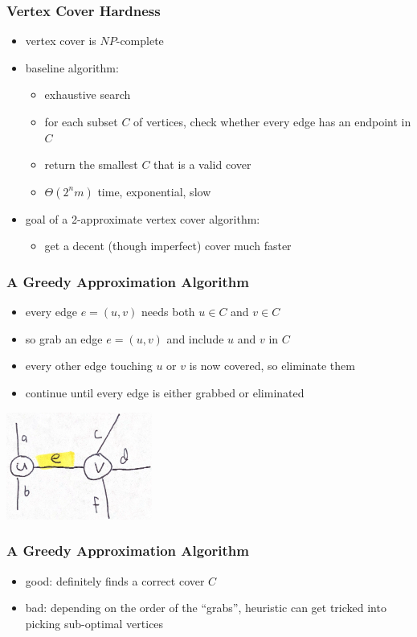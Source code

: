 \documentclass[10pt,aspectratio=169]{beamer}
\begin{document}
\begin{frame} \frametitle{Vertex Cover Hardness}
  \begin{itemize}
    \item vertex cover is $NP$-complete
    \item baseline algorithm:
    \begin{itemize}
      \item exhaustive search
      \item for each subset $C$ of vertices, check whether every edge has an
        endpoint in $C$
      \item return the smallest $C$ that is a valid cover
      \item $\Theta(2^n m)$ time, exponential, slow
    \end{itemize}
    \item goal of a 2-approximate vertex cover algorithm:
    \begin{itemize}
      \item get a decent (though imperfect) cover much faster
    \end{itemize}
  \end{itemize}
\end{frame}

\begin{frame} \frametitle{A Greedy Approximation Algorithm}
\begin{itemize}
  \item every edge $e=(u,v)$ needs both $u \in C$ and $v \in C$
  \item so grab an edge $e=(u,v)$ and include $u$ and $v$ in $C$
  \item every other edge touching $u$ or $v$ is now covered, so eliminate them
  \item continue until every edge is either grabbed or eliminated
\end{itemize}
\begin{center}
  \includegraphics[height=100pt]{vertex-cover-greedy.png}
\end{center}
\end{frame}

\begin{frame} \frametitle{A Greedy Approximation Algorithm}
\begin{itemize}
    \item good: definitely finds a correct cover $C$
    \item bad: depending on the order of the ``grabs'', heuristic can get tricked
    into picking sub-optimal vertices
\end{itemize}
\end{frame}
\end{document}
